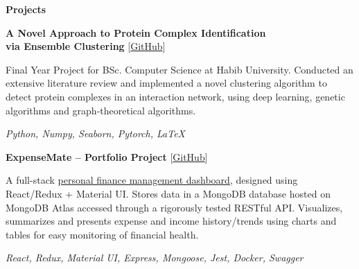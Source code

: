 \documentclass[12pt, a4paper]{article}
\begin{document}

\begin{center}
	\large\textbf{Projects}
\end{center}
\textbf{A Novel Approach to Protein Complex Identification \\ via Ensemble Clustering}	\hfill [\href{https://github.com/hurryingauto3/PPI-Complex-Prediction}{GitHub}]
\begin{center}
	\parbox{0.9\linewidth}{
		Final Year Project for BSc. Computer Science at Habib University. Conducted an extensive literature review and implemented a novel clustering algorithm to detect protein complexes in an interaction network, using deep learning, genetic algorithms and graph-theoretical algorithms.

		\textit{Python, Numpy, Seaborn, Pytorch, \LaTeX}
	}
\end{center}

%



\textbf{ExpenseMate -- Portfolio Project}	\hfill [\href{https://github.com/m-usaid99/ExpenseMate}{GitHub}]
\begin{center}
    \parbox{0.9\linewidth}{
		A full-stack \href{https://expensemate.vercel.app}{personal finance management dashboard}, designed using React/Redux + Material UI. Stores data in a MongoDB database hosted on MongoDB Atlas accessed through a rigorously tested RESTful API. Visualizes, summarizes and presents expense and income history/trends using charts and tables for easy monitoring of financial health. 

    \textit{React, Redux, Material UI, Express, Mongoose, Jest, Docker, Swagger}
    }
\end{center}

\end{document}
